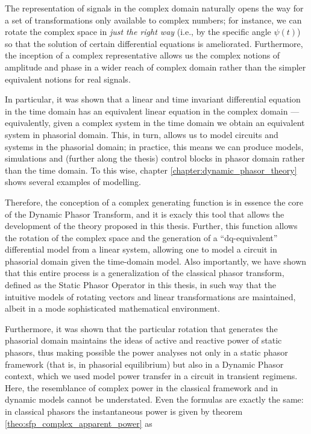 	The representation of signals in the complex domain naturally opens the way for a set of transformations only available to complex numbers; for instance, we can rotate the complex space in \textit{just the right way} (i.e., by the specific angle $\psi(t)$) so that the solution of certain differential equations is ameliorated. Furthermore, the inception of a complex representative allows us the complex notions of amplitude and phase in a wider reach of complex domain rather than the simpler equivalent notions for real signals.

	In particular, it was shown that a linear and time invariant differential equation in the time domain has an equivalent linear equation in the complex domain — equivalently, given a complex system in the time domain we obtain an equivalent system in phasorial domain. This, in turn, allows us to model circuits and systems in the phasorial domain; in practice, this means we can produce models, simulations and (further along the thesis) control blocks in phasor domain rather than the time domain. To this wise, chapter \ref{chapter:dynamic_phasor_theory} shows several examples of modelling. 

	Therefore, the conception of a complex generating function is in essence the core of the Dynamic Phasor Transform, and it is exacly this tool that allows the development of the theory proposed in this thesis. Further, this function allows the rotation of the complex space and the generation of a ``dq-equivalent'' differential model from a linear system, allowing one to model a circuit in phasorial domain given the time-domain model. Also importantly, we have shown that this entire process is a generalization of the classical phasor transform, defined as the Static Phasor Operator in this thesis, in such way that the intuitive models of rotating vectors and linear transformations are maintained, albeit in a mode sophisticated mathematical environment.

	Furthermore, it was shown that the particular rotation that generates the phasorial domain maintains the ideas of active and reactive power of static phasors, thus making possible the power analyses not only in a static phasor framework (that is, in phasorial equilibrium) but also in a Dynamic Phasor context, which we used model power transfer in a circuit in transient regimens. Here, the resemblance of complex power in the classical framework and in dynamic models cannot be understated. Even the formulas are exactly the same: in classical phasors the instantaneous power is given by theorem \ref{theo:sfp_complex_apparent_power} as

